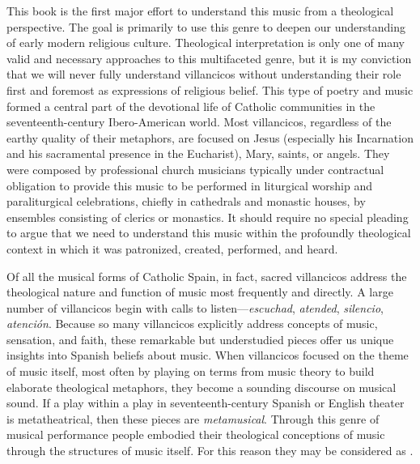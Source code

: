 This book is the first major effort to understand this music from a theological
perspective.
The goal is primarily to use this genre to deepen our understanding of early
modern religious culture.
Theological interpretation is only one of many valid and necessary approaches
to this multifaceted genre, but it is my conviction that we will never fully
understand villancicos without understanding their role first and foremost as
expressions of religious belief.
This type of poetry and music formed a central part of the devotional life of
Catholic communities in the seventeenth-century Ibero-American world.
Most villancicos, regardless of the earthy quality of their metaphors, are
focused on Jesus (especially his Incarnation and his sacramental presence in
the Eucharist), Mary, saints, or angels.
They were composed by professional church musicians typically under contractual
obligation to provide this music to be performed in liturgical worship and
paraliturgical celebrations, chiefly in cathedrals and monastic houses, by
ensembles consisting of clerics or monastics.
It should require no special pleading to argue that we need to understand this
music within the profoundly theological context in which it was patronized,
created, performed, and heard.

Of all the musical forms of Catholic Spain, in fact, sacred villancicos address
the theological nature and function of music most frequently and directly.
A large number of villancicos begin with calls to listen---\emph{escuchad},
\emph{atended}, \emph{silencio}, \emph{atención}. 
Because so many villancicos explicitly address concepts of music, sensation, and
faith, these remarkable but understudied pieces offer us unique insights into
Spanish beliefs about music.
When villancicos focused on the theme of music itself, most often by playing on
terms from music theory to build elaborate theological metaphors, they become a
sounding discourse on musical sound.
If a play within a play in seventeenth-century Spanish or English theater is
metatheatrical, then these pieces are \emph{metamusical}.
Through this genre of musical performance people embodied their theological
conceptions of music through the structures of music itself.
For this reason they may be considered as .


